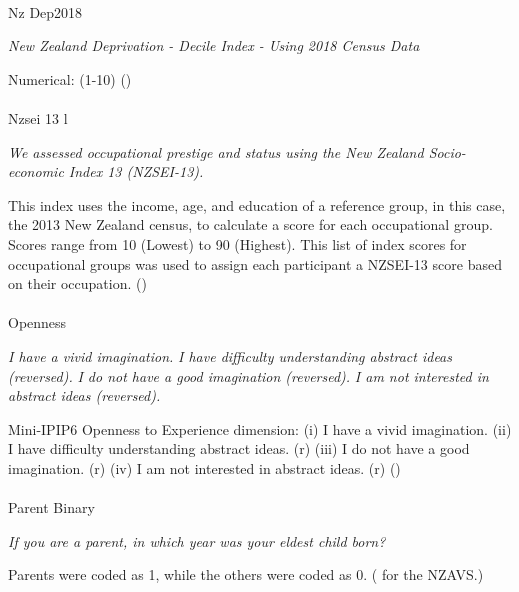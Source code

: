 \documentclass[
  single column]{article}
\makeatletter
\let\oldparagraph\paragraph
\renewcommand{\paragraph}{
    \@ifstar
      \xxxParagraphStar
      \xxxParagraphNoStar
  }
\newcommand{\xxxParagraphStar}[1]{\oldparagraph*{#1}\mbox{}}
\newcommand{\xxxParagraphNoStar}[1]{\oldparagraph{#1}\mbox{}}
\makeatother
\begin{document}
\paragraph{Nz Dep2018}\label{nz-dep2018}

\emph{New Zealand Deprivation - Decile Index - Using 2018 Census Data}

Numerical: (1-10) ()

\paragraph{Nzsei 13 l}\label{nzsei-13-l}

\emph{We assessed occupational prestige and status using the New Zealand
Socio-economic Index 13 (NZSEI-13).}

This index uses the income, age, and education of a reference group, in
this case, the 2013 New Zealand census, to calculate a score for each
occupational group. Scores range from 10 (Lowest) to 90 (Highest). This
list of index scores for occupational groups was used to assign each
participant a NZSEI-13 score based on their occupation.
()

\paragraph{Openness}\label{openness}

\emph{I have a vivid imagination.} \emph{I have difficulty understanding
abstract ideas (reversed).} \emph{I do not have a good imagination
(reversed).} \emph{I am not interested in abstract ideas (reversed).}

Mini-IPIP6 Openness to Experience dimension: (i) I have a vivid
imagination. (ii) I have difficulty understanding abstract ideas. (r)
(iii) I do not have a good imagination. (r) (iv) I am not interested in
abstract ideas. (r) ()

\paragraph{Parent Binary}\label{parent-binary}

\emph{If you are a parent, in which year was your eldest child born?}

Parents were coded as 1, while the others were coded as 0.
( for the NZAVS.)
\end{document}
